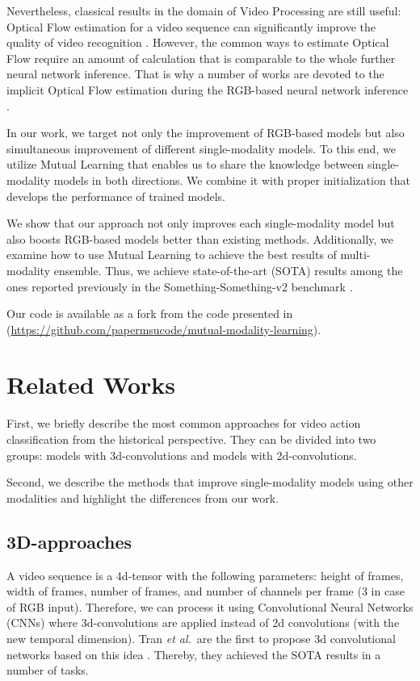 \documentclass[conference]{IEEEtran}
\begin{document}
Nevertheless, classical results in the domain of Video Processing are still useful: Optical Flow estimation for a video sequence can significantly improve the quality of video recognition \cite{simonyan2014two}. However, the common ways to estimate Optical Flow require an amount of calculation that is comparable to the whole further neural network inference. That is why a number of works are devoted to the implicit Optical Flow estimation during the RGB-based neural network inference \cite{fan2018end, Crasto_2019_CVPR,piergiovanni2019representation,Stroud_2020_WACV}.

In our work, we target not only the improvement of RGB-based models but also simultaneous improvement of different single-modality models. To this end, we utilize Mutual Learning \cite{zhang2018deep} that enables us to share the knowledge between single-modality models in both directions. We combine it with proper initialization that develops the performance of trained models.

We show that our approach not only improves each single-modality model but also boosts RGB-based models better than existing methods. Additionally, we examine how to use Mutual Learning to achieve the best results of multi-modality ensemble. Thus, we achieve state-of-the-art (SOTA) results among the ones reported previously in the Something-Something-v2 benchmark \cite{goyal2017something}.

Our code is available as a fork from the code presented in \cite{lin2019tsm} (\url{https://github.com/papermsucode/mutual-modality-learning}).

\section{Related Works}

First, we briefly describe the most common approaches for video action classification from the historical perspective. They can be divided into two groups: models with 3d-convolutions and models with 2d-convolutions.

Second, we describe the methods that improve single-modality models using other modalities and highlight the differences from our work.

\subsection{3D-approaches}

A video sequence is a 4d-tensor with the following parameters: height of frames, width of frames, number of frames, and number of channels per frame (3 in case of RGB input). Therefore, we can process it using Convolutional Neural Networks (CNNs) where 3d-convolutions are applied instead of 2d convolutions (with the new temporal dimension). Tran \textit{et al.}~are the first to propose 3d convolutional networks based on this idea \cite{tran2015learning}. Thereby, they achieved the SOTA results in a number of tasks.
\end{document}
